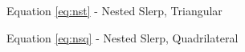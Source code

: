 \documentclass{amsart}[12pt]
\begin{document}

Equation \ref{eq:nst} - Nested Slerp, Triangular

Equation \ref{eq:nsq} - Nested Slerp, Quadrilateral
\end{document}
